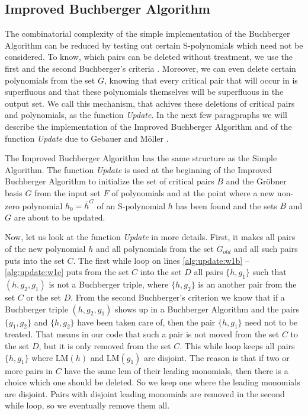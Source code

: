 \subsection{Improved Buchberger Algorithm}
The combinatorial complexity of the simple implementation of the Buchberger Algorithm can be reduced by testing out certain S-polynomials which need not be considered. To know, which pairs can be deleted without treatment, we use the first and the second Buchberger's criteria \cite{Becker93}. Moreover, we can even delete certain polynomials from the set $G$, knowing that every critical pair that will occur in is superfluous and that these polynomials themselves will be superfluous in the output set. We call this mechanism, that achives these deletions of critical pairs and polynomials, as the function \textit{Update}.  In the next few paragpraphs we will describe the implementation of the Improved Buchberger Algorithm and of the function \textit{Update} due to Gebauer and M\"oller \cite{Gebauer-Moller88}.

The Improved Buchberger Algorithm has the same structure as the Simple Algorithm. The function \textit{Update} is used at the beginning of the Improved Buchberger Algorithm to initialize the set of critical pairs $B$ and the Gr\"obner basis $G$ from the input set $F$ of polynomials and at the point where a new non-zero polynomial $h_0 = \overline{h}^G$ of an S-polynomial $h$ has been found and the sets $B$ and $G$ are about to be updated.



Now, let us look at the function \textit{Update} in more details. First, it makes all pairs of the new polynomial $h$ and all polynomials from the set $G_{old}$ and all such pairs puts into the set $C$. The first while loop on lines \ref{alg:update:w1b} -- \ref{alg:update:w1e} puts from the set $C$ into the set $D$ all pairs $\{h, g_1\}$ such that $(h, g_2, g_1)$ is not a Buchberger triple, where $\{h, g_2\}$ is an another pair from the set $C$ or the set $D$. From the second Buchberger's criterion we know that if a Buchberger triple $(h, g_2, g_1)$ shows up in a Buchberger Algorithm and the pairs $\{g_1, g_2\}$ and $\{h, g_2\}$ have been taken care of, then the pair $\{h, g_1\}$ need not to be treated. That means in our code that such a pair is not moved from the set $C$ to the set $D$, but it is only removed from the set $C$. This while loop keeps all pairs $\{h, g_1\}$ where LM$(h)$ and LM$(g_1)$ are disjoint. The reason is that if two or more pairs in $C$ have the same lcm of their leading monomials, then there is a choice which one should be deleted. So we keep one where the leading monomials are disjoint. Pairs with disjoint leading monomials are removed in the second while loop, so we eventually remove them all.

